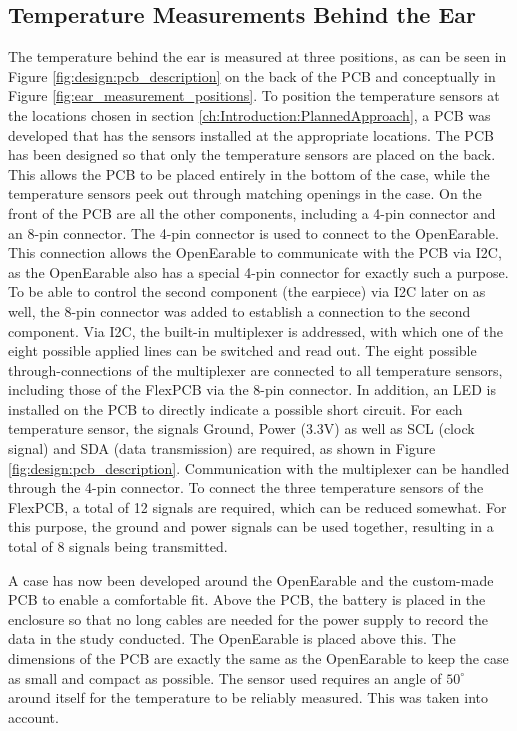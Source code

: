 \subsection{Temperature Measurements Behind the Ear}
\label{ch:Design:Prototype:BehindEar}

The temperature behind the ear is measured at three positions, as can be seen in Figure \ref{fig:design:pcb_description} on the back of the PCB and conceptually in Figure \ref{fig:ear_measurement_positions}.
To position the temperature sensors at the locations chosen in section \ref{ch:Introduction:PlannedApproach}, a PCB was developed that has the sensors installed at the appropriate locations. 
The PCB has been designed so that only the temperature sensors are placed on the back. This allows the PCB to be placed entirely in the bottom of the case, while the temperature sensors peek out through matching openings in the case. On the front of the PCB are all the other components, including a 4-pin connector and an 8-pin connector.
The 4-pin connector is used to connect to the OpenEarable. This connection allows the OpenEarable to communicate with the PCB via I2C, as the OpenEarable also has a special 4-pin connector for exactly such a purpose.
To be able to control the second component (the earpiece) via I2C later on as well, the 8-pin connector was added to establish a connection to the second component.
Via I2C, the built-in multiplexer is addressed, with which one of the eight possible applied lines can be switched and read out. The eight possible through-connections of the multiplexer are connected to all temperature sensors, including those of the FlexPCB via the 8-pin connector.
In addition, an LED is installed on the PCB to directly indicate a possible short circuit.
For each temperature sensor, the signals Ground, Power (3.3V) as well as SCL (clock signal) and SDA (data transmission) are required, as shown in Figure \ref{fig:design:pcb_description}. Communication with the multiplexer can be handled through the 4-pin connector.
To connect the three temperature sensors of the FlexPCB, a total of 12 signals are required, which can be reduced somewhat. For this purpose, the ground and power signals can be used together, resulting in a total of 8 signals being transmitted.

A case has now been developed around the OpenEarable and the custom-made PCB to enable a comfortable fit.
Above the PCB, the battery is placed in the enclosure so that no long cables are needed for the power supply to record the data in the study conducted.
The OpenEarable is placed above this.
The dimensions of the PCB are exactly the same as the OpenEarable to keep the case as small and compact as possible.
The sensor used requires an angle of $ 50 ^ \circ$ around itself for the temperature to be reliably measured. 
This was taken into account.

